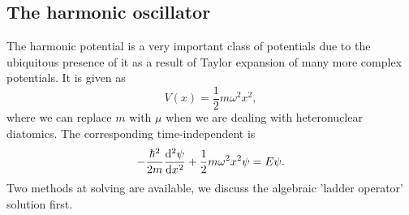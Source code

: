 \subsection{The harmonic oscillator}
The harmonic potential is a very important class of potentials due to the ubiquitous presence of it as a result of Taylor expansion of many more complex potentials. It is given as 
\begin{equation}
V(x)=\frac{1}{2}m\omega^2x^2, 
\end{equation}
where we can replace $m$ with $\mu$ when we are dealing with heteronuclear diatomics. 
The corresponding time-independent \sch is
\begin{equation}
\label{sch_quad}
-\frac{\hbar^2}{2m}\diff[2]{\psi}{x}+\frac{1}{2}m\omega^2x^2\psi=E\psi.
\end{equation}
Two methods at solving are available, we discuss the algebraic 'ladder operator' solution first. 
